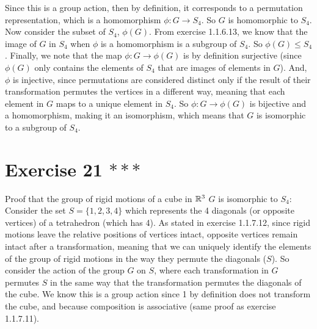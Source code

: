 \documentclass{article}
\begin{document}
    Since this is a group action, then by definition,
    it corresponds to a permutation representation,
    which is a homomorphism $\phi: G \to S_4$.
    So $G$ is homomorphic to $S_4$. \\
    Now consider the subset of $S_4$, $\phi(G)$.
    From exercise 1.1.6.13, we know that the image of $G$ in $S_4$
    when $\phi$ is a homomorphism is a subgroup of $S_4$.
    So $\phi(G) \leqslant S_4$.
    Finally, we note that the map $\phi: G \to \phi(G)$
    is by definition surjective
    (since $\phi(G)$ only contains the elements of $S_4$ that are images
    of elements in $G$).
    And, $\phi$ is injective, since permutations are considered 
    distinct only if the result of their transformation permutes the
    vertices in a different way,
    meaning that each element in $G$ maps to a unique element in $S_4$.
    So $\phi: G \to \phi(G)$ is bijective and a homomorphism,
    making it an isomorphism,
    which means that $G$ is isomorphic to a subgroup of $S_4$.


    \section*{Exercise 21 $***$}
    Proof that the group of rigid motions of a cube in $\mathbb{R}^3$ $G$
    is isomorphic to $S_4$: \\
    Consider the set $S = \{1, 2, 3, 4\}$ which represents
    the 4 diagonals (or opposite vertices) of a tetrahedron (which has 4).
    As stated in exercise 1.1.7.12,
    since rigid motions leave the relative positions of vertices intact,
    opposite vertices remain intact after a transformation,
    meaning that we can uniquely identify the elements of the group of
    rigid motions in the way they permute the diagonals ($S$).
    So consider the action of the group $G$ on $S$,
    where each transformation in $G$ permutes $S$ in the same way that
    the transformation permutes the diagonals of the cube.
    We know this is a group action since 1 by definition does not transform 
    the cube,
    and because composition is associative
    (same proof as exercise 1.1.7.11). \\
\end{document}
